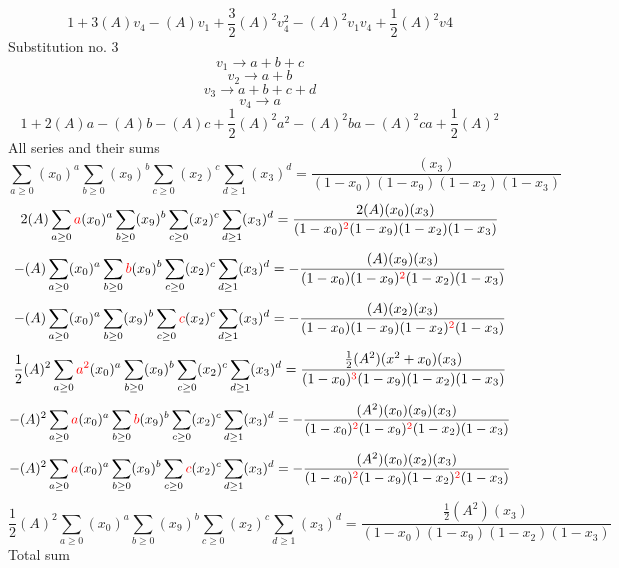 \documentclass{article}
\begin{document}
\[1+3(A)v_4-(A)v_1+\frac{3}{2}(A)^2v_4^{2}-(A)^2v_1v_4+\frac{1}{2}(A)^2v4\]Substitution no. 3\[v_1\rightarrow{a+b+c}\]\[v_2\rightarrow{a+b}\]\[v_3\rightarrow{a+b+c+d}\]\[v_4\rightarrow{a}\]\[1+2(A)a-(A)b-(A)c+\frac{1}{2}(A)^2a^{2}-(A)^2ba-(A)^2ca+\frac{1}{2}(A)^2\]All series and their sums\[\sum_{a\geq{0}}(x_0)^{a}\sum_{b\geq{0}}(x_9)^{b}\sum_{c\geq{0}}(x_2)^{c}\sum_{d\geq{1}}(x_3)^{d}=\frac{(x_3)}{(1-x_0)(1-x_9)(1-x_2)(1-x_3)}\]\[2(A)\sum_{a\geq{0}}\textcolor{red}{a}(x_0)^{a}\sum_{b\geq{0}}(x_9)^{b}\sum_{c\geq{0}}(x_2)^{c}\sum_{d\geq{1}}(x_3)^{d}=\frac{2(A)(x_0)(x_3)}{(1-x_0)^{\textcolor{red}{2}}(1-x_9)(1-x_2)(1-x_3)}\]\[-(A)\sum_{a\geq{0}}(x_0)^{a}\sum_{b\geq{0}}\textcolor{red}{b}(x_9)^{b}\sum_{c\geq{0}}(x_2)^{c}\sum_{d\geq{1}}(x_3)^{d}=-\frac{(A)(x_9)(x_3)}{(1-x_0)(1-x_9)^{\textcolor{red}{2}}(1-x_2)(1-x_3)}\]\[-(A)\sum_{a\geq{0}}(x_0)^{a}\sum_{b\geq{0}}(x_9)^{b}\sum_{c\geq{0}}\textcolor{red}{c}(x_2)^{c}\sum_{d\geq{1}}(x_3)^{d}=-\frac{(A)(x_2)(x_3)}{(1-x_0)(1-x_9)(1-x_2)^{\textcolor{red}{2}}(1-x_3)}\]\[\frac{1}{2}(A)^{2}\sum_{a\geq{0}}\textcolor{red}{a^{2}}(x_0)^{a}\sum_{b\geq{0}}(x_9)^{b}\sum_{c\geq{0}}(x_2)^{c}\sum_{d\geq{1}}(x_3)^{d}=\frac{\frac{1}{2}(A^{2})(x^{2}+x_0)(x_3)}{(1-x_0)^{\textcolor{red}{3}}(1-x_9)(1-x_2)(1-x_3)}\]\[-(A)^{2}\sum_{a\geq{0}}\textcolor{red}{a}(x_0)^{a}\sum_{b\geq{0}}\textcolor{red}{b}(x_9)^{b}\sum_{c\geq{0}}(x_2)^{c}\sum_{d\geq{1}}(x_3)^{d}=-\frac{(A^{2})(x_0)(x_9)(x_3)}{(1-x_0)^{\textcolor{red}{2}}(1-x_9)^{\textcolor{red}{2}}(1-x_2)(1-x_3)}\]\[-(A)^{2}\sum_{a\geq{0}}\textcolor{red}{a}(x_0)^{a}\sum_{b\geq{0}}(x_9)^{b}\sum_{c\geq{0}}\textcolor{red}{c}(x_2)^{c}\sum_{d\geq{1}}(x_3)^{d}=-\frac{(A^{2})(x_0)(x_2)(x_3)}{(1-x_0)^{\textcolor{red}{2}}(1-x_9)(1-x_2)^{\textcolor{red}{2}}(1-x_3)}\]\[\frac{1}{2}(A)^{2}\sum_{a\geq{0}}(x_0)^{a}\sum_{b\geq{0}}(x_9)^{b}\sum_{c\geq{0}}(x_2)^{c}\sum_{d\geq{1}}(x_3)^{d}=\frac{\frac{1}{2}(A^{2})(x_3)}{(1-x_0)(1-x_9)(1-x_2)(1-x_3)}\]
Total sum
\end{document}
